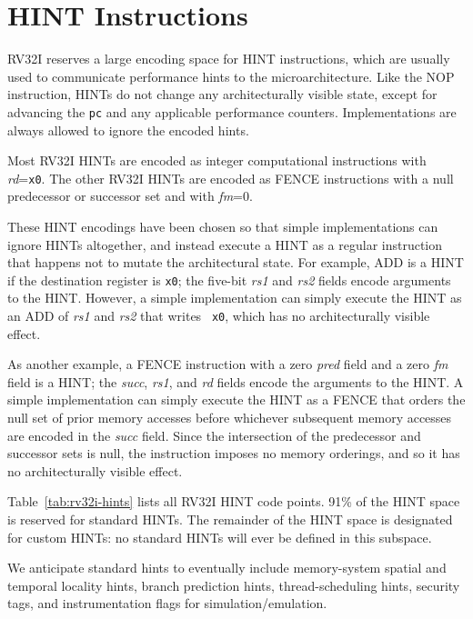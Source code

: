 \section{HINT Instructions}
\label{sec:rv32i-hints}

RV32I reserves a large encoding space for HINT instructions, which are
usually used to communicate performance hints to the
microarchitecture.
Like the NOP instruction, HINTs do not change any architecturally visible
state, except for advancing the {\tt pc} and any applicable performance
counters.
Implementations are always allowed to ignore the encoded hints.

Most RV32I HINTs are encoded as integer computational instructions with
{\em rd}={\tt x0}.
The other RV32I HINTs are encoded as FENCE instructions with a null
predecessor or successor set and with {\em fm}=0.

\begin{commentary}
These HINT encodings have been chosen so that simple implementations can ignore
HINTs altogether, and instead execute a HINT as a regular
instruction that happens not to mutate the architectural state.  For example, ADD is
a HINT if the destination register is {\tt x0}; the five-bit {\em rs1} and {\em
rs2} fields encode arguments to the HINT.  However, a simple implementation can
simply execute the HINT as an ADD of {\em rs1} and {\em rs2} that writes {\tt
x0}, which has no architecturally visible effect.

As another example, a FENCE instruction with a zero {\em pred} field and
a zero {\em fm} field is a HINT; the {\em succ}, {\em rs1}, and {\em rd}
fields encode the arguments to the HINT.
A simple implementation can simply execute the HINT as a FENCE that orders the
null set of prior memory accesses before whichever subsequent memory accesses
are encoded in the {\em succ} field.
Since the intersection of the predecessor and successor sets is null, the
instruction imposes no memory orderings, and so it has no architecturally
visible effect.
\end{commentary}

Table~\ref{tab:rv32i-hints} lists all RV32I HINT code points.  91\% of the HINT
space is reserved for standard HINTs.  The
remainder of the HINT space is designated for custom HINTs: no standard HINTs
will ever be defined in this subspace.

\begin{commentary}
We anticipate
standard hints to eventually include memory-system spatial and
temporal locality hints, branch prediction hints, thread-scheduling
hints, security tags, and instrumentation flags for
simulation/emulation.
\end{commentary}

